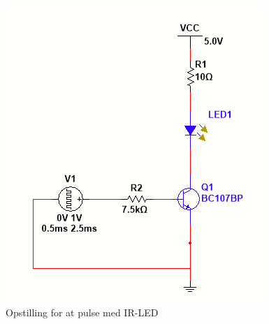 \documentclass[Rapport/Rapport_main.tex]{subfiles}
\begin{document}
\begin{figure}[H]
    \centering
    \includegraphics{Rapport/BallDispenser/BallCountSensor/graphics/Opstilling1.png}
    \caption{Opstilling for at pulse med IR-LED}
    \label{fig:IRLEDpuls}
\end{figure}
\end{document}
